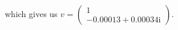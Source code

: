\documentclass[preview]{standalone}
\begin{document}
\begin{center}
\raggedright
                which gives us \(v = \begin{pmatrix}
                                1 \\
                                -0.00013 + 0.00034\mathrm{i}
                            \end{pmatrix}\).
\end{center}
\end{document}
